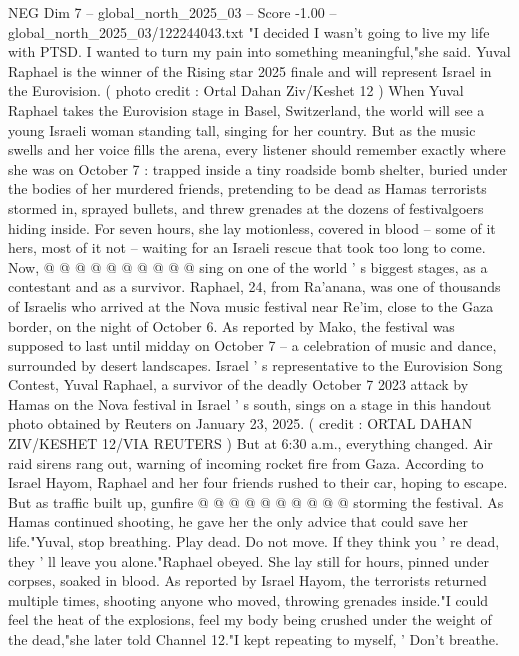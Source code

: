 \begin{textsample}{NEG Dim 7 – global\_north\_2025\_03 – Score -1.00 – global\_north\_2025\_03/122244043.txt}  \label{ex:f7_neg_138}
"I decided I wasn't going to live my life with PTSD.
I wanted to turn my pain into something meaningful,"she said.
Yuval Raphael is the winner of the Rising star 2025 finale and will represent Israel in the Eurovision. ( photo credit : Ortal Dahan Ziv/Keshet 12 ) When Yuval Raphael takes the Eurovision stage in Basel, Switzerland, the world will see a young Israeli woman standing tall, singing for her country.
But as the music swells and her voice fills the arena, every listener should remember exactly where she was on October 7 : trapped inside a tiny roadside bomb shelter, buried under the bodies of her murdered friends, pretending to be dead as Hamas terrorists stormed in, sprayed bullets, and threw grenades at the dozens of festivalgoers hiding inside.
For seven hours, she lay motionless, covered in blood -- some of it hers, most of it not -- waiting for an Israeli rescue that took too long to come.
Now, @ @ @ @ @ @ @ @ @ @ sing on one of the world ' s biggest stages, as a contestant and as a survivor.
Raphael, 24, from Ra'anana, was one of thousands of Israelis who arrived at the Nova music festival near Re'im, close to the Gaza border, on the night of October 6.
As reported by Mako, the festival was supposed to last until midday on October 7 -- a celebration of music and dance, surrounded by desert landscapes.
Israel ' s representative to the Eurovision Song Contest, Yuval Raphael, a survivor of the deadly October 7 2023 attack by Hamas on the Nova festival in Israel ' s south, sings on a stage in this handout photo obtained by Reuters on January 23, 2025. ( credit : ORTAL DAHAN ZIV/KESHET 12/VIA REUTERS ) But at 6:30 a.m., everything changed.
Air raid sirens rang out, warning of incoming rocket fire from Gaza.
According to Israel Hayom, Raphael and her four friends rushed to their car, hoping to escape.
But as traffic built up, gunfire @ @ @ @ @ @ @ @ @ @ storming the festival.
As Hamas continued shooting, he gave her the only advice that could save her life."Yuval, stop breathing.
Play dead.
Do not move.
If they think you ' re dead, they ' ll leave you alone."Raphael obeyed.
She lay still for hours, pinned under corpses, soaked in blood.
As reported by Israel Hayom, the terrorists returned multiple times, shooting anyone who moved, throwing grenades inside."I could feel the heat of the explosions, feel my body being crushed under the weight of the dead,"she later told Channel 12."I kept repeating to myself, ' Don't breathe.

\end{textsample}
